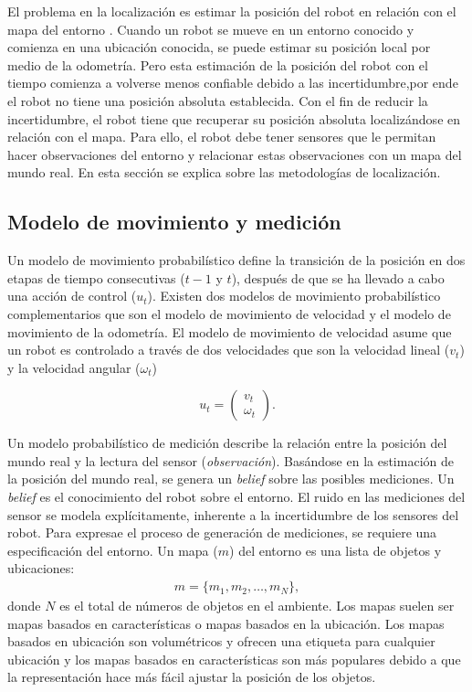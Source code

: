 El problema en la localización es estimar la posición del robot en 
relación con el mapa del entorno \cite{dellaert1999monte}. Cuando un robot 
se mueve en un entorno conocido y comienza en una ubicación conocida, se puede 
estimar su posición local por medio de la odometría. Pero esta estimación de la 
posición del robot con el tiempo comienza a volverse menos confiable debido a las 
incertidumbre,por ende el robot no tiene una posición absoluta establecida. Con el 
fin de reducir la incertidumbre, el robot tiene que recuperar su posición absoluta 
localizándose en relación con el mapa. Para ello, el robot debe tener sensores que 
le permitan hacer observaciones del entorno y relacionar estas observaciones con un 
mapa del mundo real. En esta sección se explica sobre las metodologías de localización.

\subsection{Modelo de movimiento y medici\'on}

Un modelo de movimiento probabil\'istico define la transici\'on de la posici\'on 
en dos etapas de tiempo consecutivas ($t-1$ y $t$), despu\'es de que se ha llevado 
a cabo una acci\'on de control ($u_{t}$). Existen dos modelos de movimiento 
probabil\'istico complementarios que son el modelo de movimiento de velocidad y 
el modelo de movimiento de la odometr\'ia. El modelo de movimiento de velocidad 
asume que un robot es controlado a trav\'es de dos velocidades que son la 
velocidad lineal ($v_{t}$) y la velocidad angular ($\omega_{t}$)

\begin{equation}
\label{eqn:modelMotion}
u_{t} = \begin{pmatrix}
v_{t} \\
\omega_{t}
\end{pmatrix}.
\end{equation}

Un modelo probabilístico de medición describe la relación entre la posición 
del mundo real y la lectura del sensor (\textit{observación}). Basándose en la 
estimación de la posición del mundo real, se genera un \textit{belief} sobre 
las posibles mediciones. Un \textit{belief} es el conocimiento del robot sobre el 
entorno. El ruido en las mediciones del sensor se modela explícitamente, inherente 
a la incertidumbre de los sensores del robot. Para expresae el proceso de 
generación de mediciones, se requiere una especificación del entorno. Un mapa 
($m$) del entorno es una lista de objetos y ubicaciones:
\begin{align}
m =\{m_{1}, m_{2}, \ldots, m_{N}\},
\end{align}
donde $N$ es el total de n\'umeros de objetos en el ambiente. Los mapas suelen 
ser mapas basados en caracter\'isticas o mapas basados en la ubicaci\'on. Los 
mapas basados en ubicación son volumétricos y ofrecen una etiqueta para cualquier 
ubicación y los mapas basados en características son más populares debido a que 
la representación hace más fácil ajustar la posición de los objetos.

